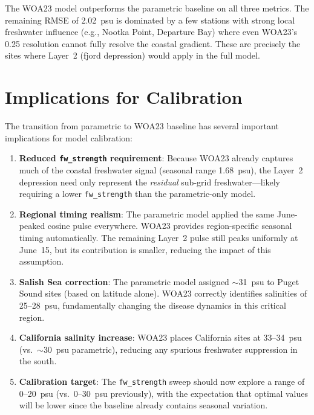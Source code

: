 \documentclass[11pt,letterpaper]{article}
\begin{document}
The WOA23 model outperforms the parametric baseline on all three
metrics. The remaining RMSE of 2.02~psu is dominated by a few
stations with strong local freshwater influence (e.g., Nootka Point,
Departure Bay) where even WOA23's 0.25\textdegree{} resolution
cannot fully resolve the coastal gradient. These are precisely the
sites where Layer~2 (fjord depression) would apply in the full model.

\section{Implications for Calibration}

The transition from parametric to WOA23 baseline has several important
implications for model calibration:

\begin{enumerate}
    \item \textbf{Reduced \texttt{fw\_strength} requirement}: Because
    WOA23 already captures much of the coastal freshwater signal (seasonal
    range 1.68~psu), the Layer~2 depression need only represent the
    \emph{residual} sub-grid freshwater---likely requiring a lower
    \texttt{fw\_strength} than the parametric-only model.

    \item \textbf{Regional timing realism}: The parametric model applied
    the same June-peaked cosine pulse everywhere. WOA23 provides
    region-specific seasonal timing automatically. The remaining Layer~2
    pulse still peaks uniformly at June~15, but its contribution is
    smaller, reducing the impact of this assumption.

    \item \textbf{Salish Sea correction}: The parametric model assigned
    $\sim$31~psu to Puget Sound sites (based on latitude alone). WOA23
    correctly identifies salinities of 25--28~psu, fundamentally changing
    the disease dynamics in this critical region.

    \item \textbf{California salinity increase}: WOA23 places California
    sites at 33--34~psu (vs.\ $\sim$30~psu parametric), reducing
    any spurious freshwater suppression in the south.

    \item \textbf{Calibration target}: The \texttt{fw\_strength} sweep
    should now explore a range of 0--20~psu (vs.\ 0--30~psu previously),
    with the expectation that optimal values will be lower since the
    baseline already contains seasonal variation.
\end{enumerate}
\end{document}

